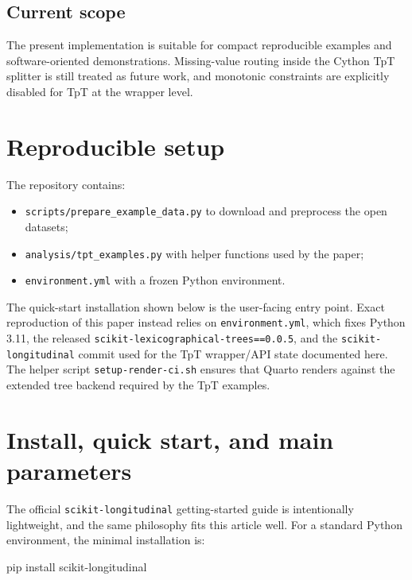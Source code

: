 \documentclass[
]{article}
\newenvironment{Shaded}{}{}
\newcommand{\ExtensionTok}[1]{#1}
\newcommand{\NormalTok}[1]{#1}
\providecommand{\tightlist}{%
  \setlength{\itemsep}{0pt}\setlength{\parskip}{0pt}}
\begin{document}
\subsection{Current scope}\label{current-scope}

The present implementation is suitable for compact reproducible examples
and software-oriented demonstrations. Missing-value routing inside the
Cython TpT splitter is still treated as future work, and monotonic
constraints are explicitly disabled for TpT at the wrapper level.

\section{Reproducible setup}\label{reproducible-setup}

The repository contains:

\begin{itemize}
\tightlist
\item
  \texttt{scripts/prepare\_example\_data.py} to download and preprocess
  the open datasets;
\item
  \texttt{analysis/tpt\_examples.py} with helper functions used by the
  paper;
\item
  \texttt{environment.yml} with a frozen Python environment.
\end{itemize}

The quick-start installation shown below is the user-facing entry point.
Exact reproduction of this paper instead relies on
\texttt{environment.yml}, which fixes Python 3.11, the released
\texttt{scikit-lexicographical-trees==0.0.5}, and the
\texttt{scikit-longitudinal} commit used for the TpT wrapper/API state
documented here. The helper script \texttt{setup-render-ci.sh} ensures
that Quarto renders against the extended tree backend required by the
TpT examples.

\section{Install, quick start, and main
parameters}\label{install-quick-start-and-main-parameters}

The official \texttt{scikit-longitudinal} getting-started guide is
intentionally lightweight, and the same philosophy fits this article
well. For a standard Python environment, the minimal installation is:

\begin{Shaded}
\begin{Highlighting}[]
\ExtensionTok{pip}\NormalTok{ install scikit{-}longitudinal}
\end{Highlighting}
\end{Shaded}
\end{document}
